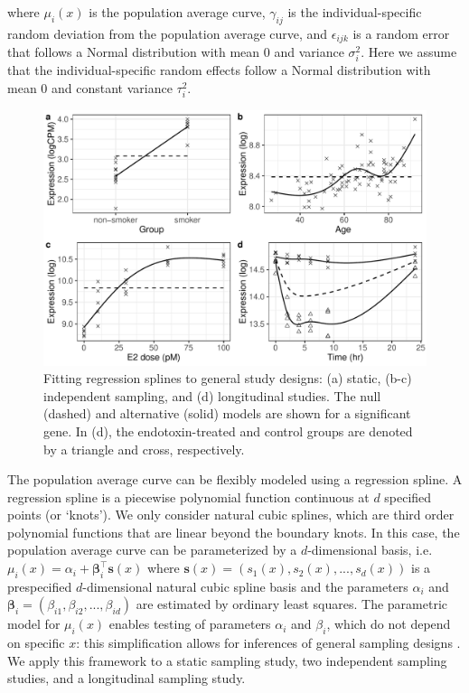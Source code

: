 \documentclass[11pt]{article}
\begin{document}
\noindent where $\mu_{i}(x)$ is the population average curve, $\gamma_{ij}$ is the individual-specific random deviation from the population average curve, and $\epsilon_{ijk}$ is a random error that follows a Normal distribution with mean 0 and variance $\sigma_{i}^{2}$. Here we assume that the individual-specific random effects follow a Normal distribution with mean 0 and constant variance $\tau_{i}^{2}$.
\begin{figure}[!ht]
\centering
\includegraphics[scale = .45]{../analysis/figures/lsi_fig2.pdf}  
\caption{Fitting regression splines to general study designs: (a) static, (b-c) independent sampling, and (d) longitudinal studies. The null (dashed) and alternative (solid) models are shown for a significant gene. In (d), the endotoxin-treated and control groups are denoted by a triangle and cross, respectively. }
\label{fig:spfit}
\end{figure}

The population average curve can be flexibly modeled using a regression spline. A regression spline is a piecewise polynomial function continuous at $d$ specified points (or `knots'). We only consider natural cubic splines, which are third order polynomial functions that are linear beyond the boundary knots. In this case, the population average curve can be parameterized by a $d$-dimensional basis, i.e. $\mu_{i}(x) = \alpha_{i} + \mathbf{\beta}^{\top}_{i}\mathbf{s}(x)$ where $\mathbf{s}(x) = (s_{1}(x), s_{2}(x), ..., s_{d}(x))$ is a prespecified $d$-dimensional natural cubic spline basis and the parameters $\alpha_{i}$ and $\mathbf{\beta}_{i} =  (\beta_{i1}, \beta_{i2}, ..., \beta_{id})$ are estimated by ordinary least squares. The parametric model for $\mu_{i}(x)$ enables testing of parameters $\alpha_{i}$ and $\beta_{i}$, which do not depend on specific $x$: this simplification allows for inferences of general sampling designs \citep{Storey_2005_time}. We apply this framework to a static sampling study, two independent sampling studies, and a longitudinal sampling study.
\end{document}
